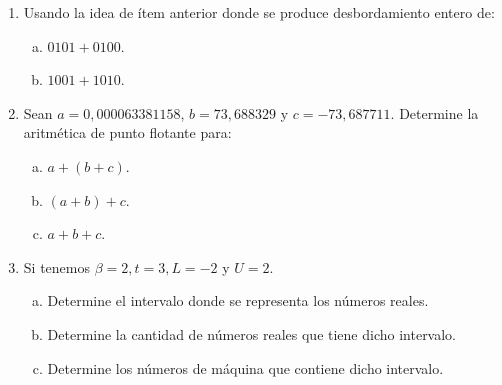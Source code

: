 \documentclass{beamer}
\newcounter{savedenum}
\newcommand*{\saveenum}{\setcounter{savedenum}{\theenumi}}
\newcommand*{\resume}{\setcounter{enumi}{\thesavedenum}}
\begin{document}
\begin{frame}
	\begin{enumerate}
		\resume
		\item Usando la idea de ítem anterior donde se produce desbordamiento entero de:
		      \begin{multicols}{2}
			      \begin{enumerate}[a)]
				      \item $0101+0100$.
				      \item $1001+1010$.
			      \end{enumerate}
		      \end{multicols}
		\item Sean $a=0,000063381158$, $b=73,688329$ y $c=-73,687711$. Determine la aritmética de punto flotante para:
		      \begin{multicols}{3}
			      \begin{enumerate}[a)]
				      \item $a+(b+c)$.
				      \item $(a+b)+c$.
				      \item $a+b+c$.
			      \end{enumerate}
		      \end{multicols}
		\item Si tenemos $\beta=2, t=3, L=-2$ y $U=2$.
		      \begin{enumerate}[a)]
			      \item Determine el intervalo donde se representa los números reales.
			      \item Determine la cantidad de números reales que tiene dicho intervalo.
			      \item Determine los números de máquina que contiene dicho intervalo.
		      \end{enumerate}
		      \saveenum
	\end{enumerate}
\end{frame}
\end{document}
